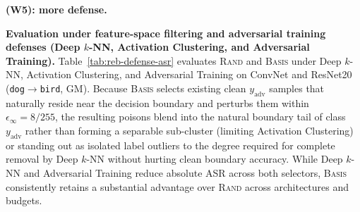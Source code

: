\bigskip
\noindent\textbf{(W5): more defense.}


\bigskip
\noindent\textbf{Evaluation under feature-space filtering and adversarial training defenses (Deep $k$-NN, Activation Clustering, and Adversarial Training).}
Table~\ref{tab:reb-defense-asr} evaluates \textsc{Rand} and \textsc{Basis} under Deep $k$-NN, Activation Clustering, and Adversarial Training on ConvNet and ResNet20 (\texttt{dog}$\rightarrow$\texttt{bird}, GM). Because \textsc{Basis} selects existing clean $y_{\text{adv}}$ samples that naturally reside near the decision boundary and perturbs them within $\epsilon_\infty = 8/255$, the resulting poisons blend into the natural boundary tail of class $y_{\text{adv}}$ rather than forming a separable sub-cluster (limiting Activation Clustering) or standing out as isolated label outliers to the degree required for complete removal by Deep $k$-NN without hurting clean boundary accuracy. While Deep $k$-NN and Adversarial Training reduce absolute ASR across both selectors, \textsc{Basis} consistently retains a substantial advantage over \textsc{Rand} across architectures and budgets.

